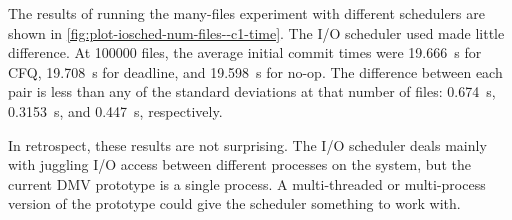 The results of running the many-files experiment with different schedulers are
shown in \autoref{fig:plot-iosched-num-files--c1-time}. The I/O scheduler used
made little difference. At \num{100000} files, the average initial \gls{commit}
times were \SI{19.666}{\s} for CFQ, \SI{19.708}{\s} for deadline, and
\SI{19.598}{\s} for no-op. The difference between each pair is less than any of
the standard deviations at that number of files: \SI{0.674}{\s},
\SI{0.3153}{\s}, and \SI{0.447}{\s}, respectively.

In retrospect, these results are not surprising. The I/O scheduler deals mainly
with juggling I/O access between different processes on the system, but the
current \gls{DMV} prototype is a single process. A multi-threaded or
multi-process version of the prototype could give the scheduler something to
work with.

%
